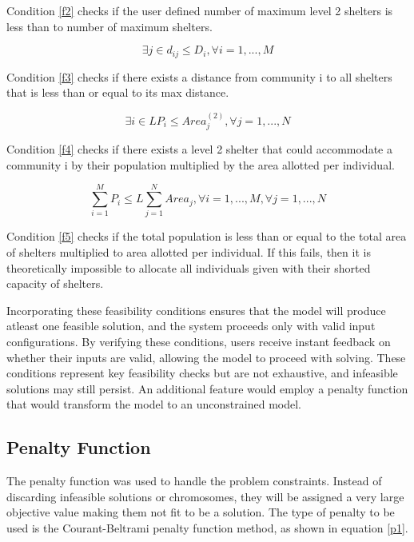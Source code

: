 	Condition \ref{f2} checks if the user defined number of maximum level 2 shelters is less than to number of maximum shelters.
	
	\begin{equation} 
		\label{f3}
		\exists j \in d_{ij} \le D_{i}, \forall i = 1, ..., M
	\end{equation}
	
	Condition \ref{f3} checks if there exists a distance from community i to all shelters that is less than or equal to its max distance.
	
	\begin{equation} 
		\label{f4}
		\exists i \in LP_{i} \le Area_{j}^{(2)}, \forall j = 1, ..., N
	\end{equation}
	
	Condition \ref{f4} checks if there exists a level 2 shelter that could accommodate a community i by their population multiplied by the area allotted per individual. 
	
	\begin{equation} 
		\label{f5}
		\sum_{i=1}^{M}P_{i} \le L\sum_{j=1}^{N}Area_{j}, \forall i=1,...,M,  \forall j=1,...,N
	\end{equation}
	
	Condition \ref{f5} checks if the total population is less than or equal to the total area of shelters multiplied to area allotted per individual. If this fails, then it is theoretically impossible to allocate all individuals given with their shorted capacity of shelters.
	
	Incorporating these feasibility conditions ensures that the model will produce atleast one feasible solution, and the system proceeds only with valid input configurations. By verifying these conditions, users receive instant feedback on whether their inputs are valid, allowing the model to proceed with solving. These conditions represent key feasibility checks but are not exhaustive, and infeasible solutions may still persist. An additional feature would employ a penalty function that would transform the model to an unconstrained model.	
	
\subsection{Penalty Function}
	The penalty function was used to handle the problem constraints. Instead of discarding infeasible solutions or chromosomes, they will be assigned a very large objective value making them not fit to be a solution. The type of penalty to be used is the Courant-Beltrami penalty function method, as shown in equation \ref{p1}.
	
